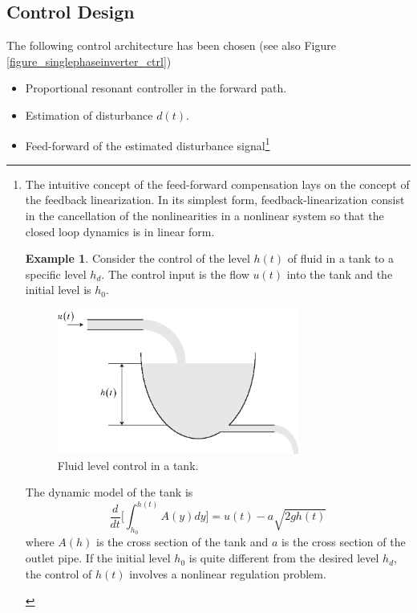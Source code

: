 \documentclass[11pt,a4paper,oneside]{book}
\numberwithin{equation}{section}
\theoremstyle{it}
\theoremstyle{definition}
\newtheorem{example}{Example}[chapter]
\begin{document}
\subsection{Control Design}
The following control architecture has been chosen (see also Figure 
\ref{figure_singlephaseinverter_ctrl})
\begin{itemize}
	\item Proportional resonant controller in the forward path.
	\item Estimation of disturbance $d(t)$.
	\item Feed-forward of the estimated disturbance signal\footnote{
		The intuitive concept of the feed-forward compensation lays on the 
		concept of the feedback linearization. In its simplest form, feedback-linearization consist in the cancellation of the nonlinearities in a nonlinear system so that the closed loop dynamics is in linear form. 
		\begin{example}
			Consider the control of the level $h(t)$ of fluid in a tank to a 
			specific level $h_d$. The control input is the flow $u(t)$ into the 
			tank and the initial level is $h_0$.
			\begin{figure}[H]
				\centering
				\includegraphics[width = 225pt, 
				keepaspectratio]{figures/single_phase_inverter/fluid_level_control_1.eps}
				\captionsetup{width=0.5\textwidth, font=small}		
				\caption{Fluid level control in a tank.}
				\label{}
			\end{figure}
			The dynamic model of the tank is
			\begin{equation}\label{fblin_1}
				\frac{d}{dt}\Big[\int_{h_0}^{h(t)}A(y)dy\Big]=u(t)-a\sqrt{2gh(t)}
			\end{equation}
			where $A(h)$ is the cross section of the tank and $a$ is the cross 
			section of the outlet pipe. If the initial level $h_0$ is quite 
			different from the desired level $h_d$, the control of $h(t)$ 
			involves a nonlinear regulation problem.
			

\end{example}}
\end{itemize}
\end{document}

